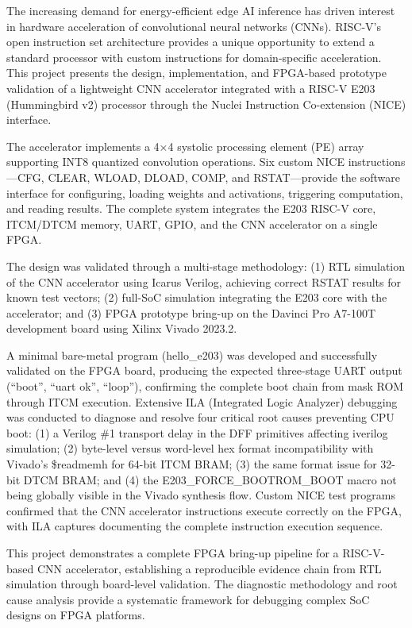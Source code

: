 The increasing demand for energy-efficient edge AI inference has driven interest in hardware acceleration of convolutional neural networks (CNNs). RISC-V’s open instruction set architecture provides a unique opportunity to extend a standard processor with custom instructions for domain-specific acceleration. This project presents the design, implementation, and FPGA-based prototype validation of a lightweight CNN accelerator integrated with a RISC-V E203 (Hummingbird v2) processor through the Nuclei Instruction Co-extension (NICE) interface.

The accelerator implements a 4×4 systolic processing element (PE) array supporting INT8 quantized convolution operations. Six custom NICE instructions—CFG, CLEAR, WLOAD, DLOAD, COMP, and RSTAT—provide the software interface for configuring, loading weights and activations, triggering computation, and reading results. The complete system integrates the E203 RISC-V core, ITCM/DTCM memory, UART, GPIO, and the CNN accelerator on a single FPGA.

The design was validated through a multi-stage methodology: (1) RTL simulation of the CNN accelerator using Icarus Verilog, achieving correct RSTAT results for known test vectors; (2) full-SoC simulation integrating the E203 core with the accelerator; and (3) FPGA prototype bring-up on the Davinci Pro A7-100T development board using Xilinx Vivado 2023.2.

A minimal bare-metal program (hello\_e203) was developed and successfully validated on the FPGA board, producing the expected three-stage UART output (“boot”, “uart ok”, “loop”), confirming the complete boot chain from mask ROM through ITCM execution. Extensive ILA (Integrated Logic Analyzer) debugging was conducted to diagnose and resolve four critical root causes preventing CPU boot: (1) a Verilog \#1 transport delay in the DFF primitives affecting iverilog simulation; (2) byte-level versus word-level hex format incompatibility with Vivado’s \$readmemh for 64-bit ITCM BRAM; (3) the same format issue for 32-bit DTCM BRAM; and (4) the E203\_\-FORCE\_\-BOOTROM\_\-BOOT macro not being globally visible in the Vivado synthesis flow. Custom NICE test programs confirmed that the CNN accelerator instructions execute correctly on the FPGA, with ILA captures documenting the complete instruction execution sequence.

This project demonstrates a complete FPGA bring-up pipeline for a RISC-V-based CNN accelerator, establishing a reproducible evidence chain from RTL simulation through board-level validation. The diagnostic methodology and root cause analysis provide a systematic framework for debugging complex SoC designs on FPGA platforms.

